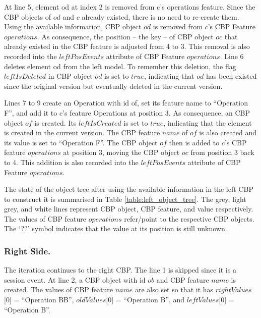 \documentclass{llncs}
\begin{document}
At line 5, element \textsf{od} at index 2 is removed from \textsf{c}'s \textsf{operations} feature. Since the CBP objects of $od$ and $c$ already existed, there is no need to re-create them. Using the available information, CBP object $od$ is removed from $c$'s CBP Feature $operations$. As consequence, the position -- the key -- of CBP object $oc$ that already existed in the CBP feature is adjusted from 4 to 3. This removal is also recorded into the $leftPosEvents$ attribute of CBP Feature $operations$. Line 6 deletes element \textsf{od} from the left model. To remember this deletion, the flag $leftIsDeleted$ in CBP object $od$ is set to $true$, indicating that $od$ has been existed since the original version but eventually deleted in the current version. 

Lines 7 to 9 create an \textsf{Operation} with id \textsf{of}, set its feature \textsf{name} to ``Operation F'', and add it to \textsf{c}'s feature \textsf{Operations} at position 3. As consequence, an CBP object $of$ is created. Its $leftIsCreated$ is set to $true$, indicating that the element is created in the current version. The CBP feature $name$ of $of$ is also created and its value is set to ``Operation F''. The CBP object $of$ then is added to $c$'s CBP feature $operations$ at position 3, moving the CBP object $oc$ from position 3 back to 4. This addition is also recorded into the $leftPosEvents$ attribute of CBP Feature $operations$.

The state of the object tree after using the available information in the left CBP to construct it is summarised in Table \ref{table:left_object_tree}. The grey, light grey, and white lines represent CBP object, CBP feature, and value respectively. The values of CBP feature $operations$ refer/point to the respective CBP objects. The `??' symbol indicates that the value at its position is still unknown.

\subsubsection{Right Side.} 
\label{sec:right_side}
The iteration continues to the right CBP. The line 1 is skipped since it is a session event.  At line 2, a CBP object with id $ob$ and CBP feature $name$ is created. The values of CBP feature $name$ are also set so that it has $rightValues$[0] = ``Operation BB'', $oldValues$[0] = ``Operation B'', and $leftValues$[0] = ``Operation B''. 
\end{document}
